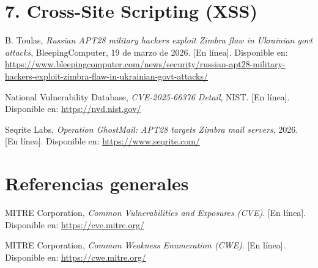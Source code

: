 \section*{7. Cross-Site Scripting (XSS)}
\begin{enumerate}[label={[}\arabic*{]}, start=14]
    \item B. Toulas, \textit{Russian APT28 military hackers exploit Zimbra flaw in Ukrainian govt attacks}, BleepingComputer, 19 de marzo de 2026. [En línea]. Disponible en: \url{https://www.bleepingcomputer.com/news/security/russian-apt28-military-hackers-exploit-zimbra-flaw-in-ukrainian-govt-attacks/}
    \item National Vulnerability Database, \textit{CVE-2025-66376 Detail}, NIST. [En línea]. Disponible en: \url{https://nvd.nist.gov/}
    \item Seqrite Labs, \textit{Operation GhostMail: APT28 targets Zimbra mail servers}, 2026. [En línea]. Disponible en: \url{https://www.seqrite.com/}
\end{enumerate}

\section*{Referencias generales}
\begin{enumerate}[label={[}\arabic*{]}, start=17]
    \item MITRE Corporation, \textit{Common Vulnerabilities and Exposures (CVE)}. [En línea]. Disponible en: \url{https://cve.mitre.org/}
    \item MITRE Corporation, \textit{Common Weakness Enumeration (CWE)}. [En línea]. Disponible en: \url{https://cwe.mitre.org/}
\end{enumerate}


